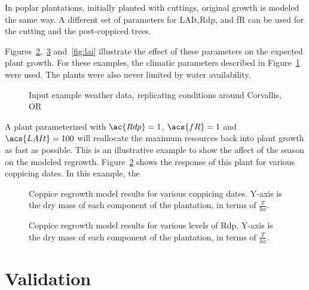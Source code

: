 \documentclass[10pt]{article}
\begin{document}
In poplar plantations, initially planted with cuttings, original
growth is modeled the same way.  A different set of parameters for
\ac{LAIt},\ac{Rdp}, and \acs{fR} can be used for the cutting and the
post-coppiced trees.

Figures~\ref{fig:date},~\ref{fig:rdp} and~\ref{fig:lai} illustrate the
effect of these parameters on the expected plant growth.  For these
examples, the climatic parameters described in
Figure~\ref{fig:weather} were used.  The plants were also never
limited by water availability.

\begin{figure}
  \centering
  
  \caption{Input example weather data, replicating conditions around
    Corvallis, OR}
  \label{fig:weather}
\end{figure}

A plant parameterized with $\ac{Rdp}=1$, $\acs{fR}=1$ and
$\acs{LAIt}=100$ will reallocate the maximum resources back into plant
growth as fast as possible.  This is an illustrative example to show
the affect of the season on the modeled regrowth.
Figure~\ref{fig:date} shows the response of this plant for various
coppicing dates.  In this example, the

\begin{figure}
  \centering
  
  \caption{Coppice regrowth model results for various coppicing dates.
    Y-axis is the dry mass of each component of the plantation, in
    terms of $\frac{T}{ha}$.}
  \label{fig:date}
\end{figure}

\begin{figure}
  \centering
  
  \caption{Coppice regrowth model results for various levels of \acf{Rdp}.
    Y-axis is the dry mass of each component of the plantation, in
    terms of $\frac{T}{ha}$.}
  \label{fig:rdp}
\end{figure}

%  

\section*{Validation}
\label{sec:validation}
\end{document}
